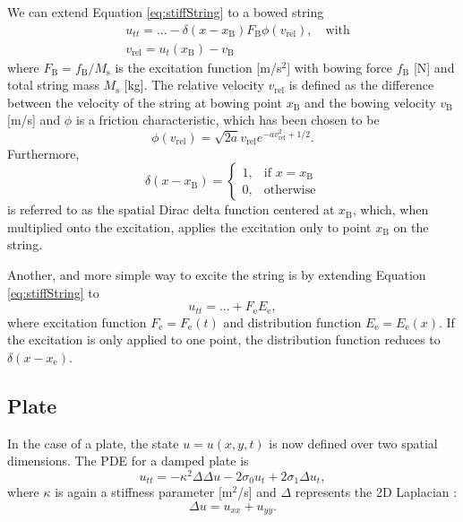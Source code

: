 \documentclass{article}
\begin{document}
We can extend Equation \eqref{eq:stiffString} to a bowed string \cite{Bilbao2009:NumericalSoundSynthesis} 
\begin{align}
    \label{eq:bowedString} &u_{tt} = ... - \delta(x-x_\text{B})F_\text{B}\phi(v_\text{rel}), \quad \text{with} \\
    &v_\text{rel} = u_t(x_\text{B}) - v_\text{B}
\end{align}
where $F_\text{B} = f_\text{B}/ M_\text{s}$ is the excitation function [m/s$^2$] with bowing force $f_\text{B}$ [N] and total string mass $M_\text{s}$ [kg]. The relative velocity $v_\text{rel}$ is defined as the difference between the velocity of the string at bowing point $x_\text{B}$ and the bowing velocity $v_\text{B}$ [m/s] and $\phi$ is a friction characteristic, which has been chosen to be \cite{Bilbao2009:NumericalSoundSynthesis}
\begin{equation}
    \phi(v_\text{rel}) = \sqrt{2a}v_\text{rel} e^{-av_\text{rel}^2+1/2}.
\end{equation}
Furthermore,
\begin{equation} \label{eq:dirac}
    \delta(x-x_\text{B}) =
\begin{cases}
    1, & \text{if } x=x_\text{B}\\
    0,              & \text{otherwise}
\end{cases}
\end{equation}
is referred to as the spatial Dirac delta function centered at $x_\text{B}$, which, when multiplied onto the excitation, applies the excitation only to point $x_\text{B}$ on the string.

Another, and more simple way to excite the string is by extending Equation \eqref{eq:stiffString} to
\begin{equation}
    \label{eq:excitedString} u_{tt} = ... + F_\text{e}E_\text{e},
\end{equation}
where excitation function $F_\text{e} = F_\text{e}(t)$ and distribution function $E_\text{e} = E_\text{e}(x)$. If the excitation is only applied to one point, the distribution function reduces to $\delta(x-x_\text{e})$.
\subsection{Plate}\label{subsec:platePDE}
In the case of a plate, the state $u = u(x,y,t)$ is now defined over two spatial dimensions. The PDE for a damped plate is \cite{Bilbao2009:NumericalSoundSynthesis}
\begin{equation}\label{eq:platePDE}
    u_{tt} = -\kappa^2 \Delta\Delta u - 2 \sigma_0 u_{t} + 2\sigma_1 \Delta u_{t},
\end{equation}
where $\kappa$ is again a stiffness parameter [m$^2$/s] and $\Delta$ represents the 2D Laplacian \cite{Bilbao2009:NumericalSoundSynthesis}:
\begin{equation}
    \Delta u = u_{xx} + u_{yy}.
\end{equation}
\end{document}
